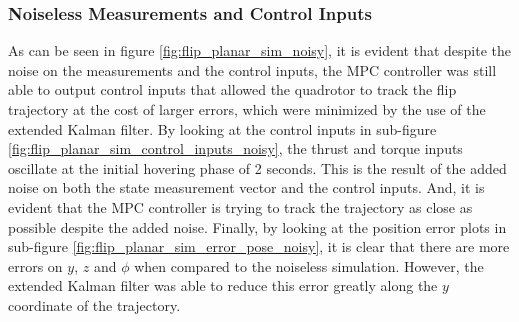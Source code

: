 \documentclass{thesisreport}
\begin{document}
\subsubsection*{Noiseless Measurements and Control Inputs}
As can be seen in figure \ref{fig:flip_planar_sim_noisy}, it is evident that despite the noise on the measurements and the control inputs, the MPC controller was still able to output control inputs that allowed the quadrotor to track the flip trajectory at the cost of larger errors, which were minimized by the use of the extended Kalman filter. By looking at the control inputs in sub-figure \ref{fig:flip_planar_sim_control_inputs_noisy}, the thrust and torque inputs oscillate at the initial hovering phase of 2 seconds. This is the result of the added noise on both the state measurement vector and the control inputs. And, it is evident that the MPC controller is trying to track the trajectory as close as possible despite the added noise. Finally, by looking at the position error plots in sub-figure \ref{fig:flip_planar_sim_error_pose_noisy}, it is clear that there are more errors on $y$, $z$ and $\phi$ when compared to the noiseless simulation. However, the extended Kalman filter was able to reduce this error greatly along the $y$ coordinate of the trajectory.








\newpage
\end{document}
